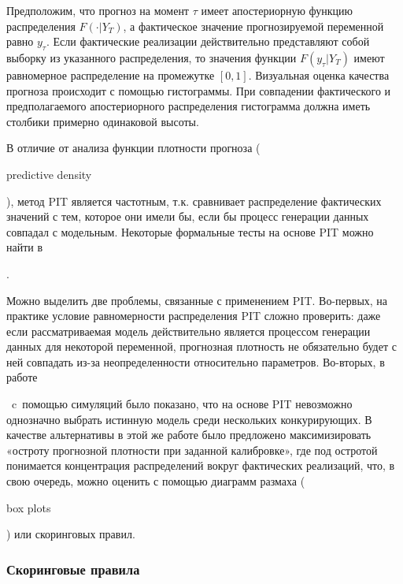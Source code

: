 \documentclass[11pt]{article} %
\newcommand{\eng}[1]{\begin{otherlanguage}{english}#1\end{otherlanguage}}
\begin{document}
Предположим, что прогноз на момент $\tau$ имеет апостериорную функцию распределения $F(\cdot | Y_T)$, а фактическое значение прогнозируемой переменной равно $y_{\tau}$. Если фактические реализации действительно представляют собой выборку из указанного распределения, то значения функции $F(y_{\tau}|Y_T)$ имеют равномерное распределение на промежутке $[0, 1]$. Визуальная оценка качества прогноза происходит с помощью гистограммы. При совпадении фактического и предполагаемого апостериорного распределения гистограмма должна  иметь столбики примерно одинаковой высоты.


В отличие от анализа функции плотности прогноза (\eng{predictive density}), метод  PIT является частотным, т.к. сравнивает распределение фактических значений с тем, которое они имели бы, если бы процесс генерации данных совпадал с модельным. Некоторые формальные тесты на основе PIT можно найти в \eng{\cite{geweke_amisano_2010}}.

Можно выделить две проблемы, связанные с применением PIT. Во-первых, на практике условие равномерности распределения PIT сложно проверить: даже если рассматриваемая модель действительно является процессом генерации данных для некоторой переменной, прогнозная плотность не обязательно будет с ней совпадать из-за неопределенности относительно параметров.
Во-вторых,  в работе \eng{\cite{gneiting_al_2007}}~c~помощью симуляций было показано, что на основе PIT невозможно однозначно выбрать истинную модель среди нескольких конкурирующих. В качестве альтернативы в этой же работе было предложено максимизировать «остроту прогнозной плотности при заданной калибровке», где под остротой понимается концентрация распределений вокруг фактических реализаций, что, в свою очередь, можно оценить с помощью диаграмм размаха (\eng{box plots}) или скоринговых правил.



\subsubsection{Скоринговые правила}
\end{document}
